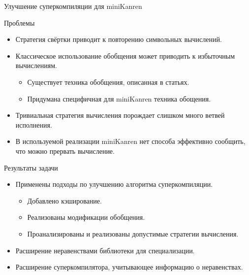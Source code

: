 \documentclass[xcolor=table]{beamer}
\newcommand{\citepres}[1]{{\it \citetitle{#1}}, \citeauthor{#1}, \citeyear{#1}}
\begin{document}
\begin{frame}{Улучшение суперкомпиляции для miniKanren}
\begin{block}{Проблемы}
\begin{itemize}
\item Стратегия свёртки приводит к повторению символьных вычислений.
\item Классическое использование обобщения может приводить к избыточным вычислениям.
\begin{itemize}
\item Существует техника обобщения, описанная в статьях\footnotemark.
\item Придумана специфичная для miniKanren техника обощения.
\end{itemize}

\item Тривиальная стратегия вычисления порождает слишком много ветвей исполнения.
\item В используемой реализации miniKanren нет способа эффективно сообщить, что можно прервать вычисление.
\end{itemize}
\end{block}
\footnotetext{\citepres{scPos}}
\end{frame}

\begin{frame}{Результаты задачи}
\begin{itemize}
\item Применены подходы по улучшению алгоритма суперкомпиляции.
\begin{itemize}
\item Добавлено кэширование.
\item Реализованы модификации обобщения.
\item Проанализированы и реализованы допустимые стратегии вычисления.
\end{itemize}
\item Расширение неравенствами библиотеки для специализации.
\item Расширение суперкомпилятора, учитывающее информацию о неравенствах.
\end{itemize}
\end{frame}
\end{document}

